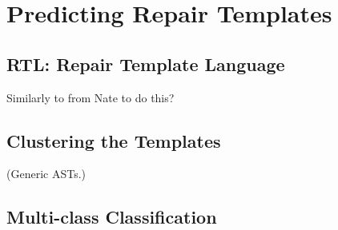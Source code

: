 \section{Predicting Repair Templates}
\label{sec:templ-pred}

\subsection{RTL: Repair Template Language}
\label{subsec:lang}

 Similarly to \lang from Nate to do this?




\subsection{Clustering the Templates}
\label{subsec:clustering}

 (Generic ASTs.)





\subsection{Multi-class Classification}
\label{subsec:multi-class}


